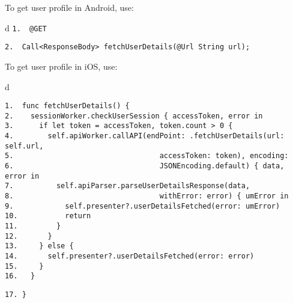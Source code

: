 \documentclass[a4paper,12pt]{book}
\begin{document}
To get user profile in Android, use:

\begin{codebloc}
\begin{tabular}{d}
\verb|1.  @GET|

\verb|2.  Call<ResponseBody> fetchUserDetails(@Url String url);|
\end{tabular}
\end{codebloc}


To get user profile in iOS, use:

\begin{codebloc}
\begin{tabular}{d}
\vspace{2pt}
\begin{verbatim}
1.  func fetchUserDetails() {
2.    sessionWorker.checkUserSession { accessToken, error in
3.      if let token = accessToken, token.count > 0 {
4.        self.apiWorker.callAPI(endPoint: .fetchUserDetails(url: self.url,
5.                                  accessToken: token), encoding:
6.                                  JSONEncoding.default) { data, error in
7.          self.apiParser.parseUserDetailsResponse(data,
8.                                  withError: error) { umError in
9.            self.presenter?.userDetailsFetched(error: umError)
10.           return
11.         }
12.       }
13.     } else {
14.       self.presenter?.userDetailsFetched(error: error)
15.     }
16.   }
\end{verbatim}
\verb|17. }|
\end{tabular}
\end{codebloc}

\end{document}

